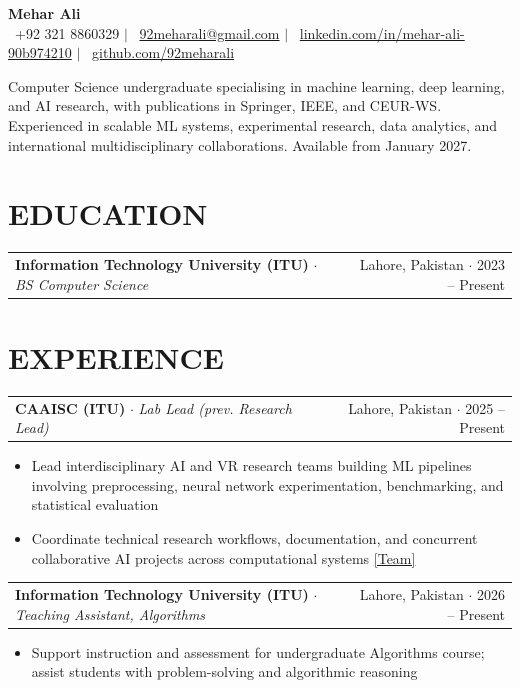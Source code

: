 \documentclass[letterpaper,8.5pt]{article}
\makeatletter
\newcommand{\resumeItem}[1]{
  \item \small{#1}
}
\newcommand{\resumeSubheading}[4]{
  \vspace{1pt}
  \begin{tabular*}{\textwidth}{l@{\extracolsep{\fill}}r}
    \textbf{\small #1} {\color{dark-grey}\small $\cdot$} \textit{\small #3} & {\color{dark-grey}\small #4 $\cdot$ #2} \\
  \end{tabular*}
  \vspace{-5pt}
}
\makeatother
\begin{document}
\begin{center}
    {\LARGE \textbf{Mehar Ali}} \\ \vspace{3pt}
    \small
    \faPhone* \ +92 321 8860329 \hspace{4pt}$|$\hspace{4pt}
    \faEnvelope \ \href{mailto:92meharali@gmail.com}{92meharali@gmail.com} \hspace{4pt}$|$\hspace{4pt}
    \faLinkedin \ \href{https://www.linkedin.com/in/mehar-ali-90b974210}{linkedin.com/in/mehar-ali-90b974210} \hspace{4pt}$|$\hspace{4pt}
    \faGithub \ \href{https://github.com/92meharali}{github.com/92meharali}
\end{center}

\vspace{-8pt}
\small{Computer Science undergraduate specialising in machine learning, deep learning, and AI research, with publications in Springer, IEEE, and CEUR-WS. Experienced in scalable ML systems, experimental research, data analytics, and international multidisciplinary collaborations. Available from January 2027.}

\section{EDUCATION}
\resumeSubheading{Information Technology University (ITU)}{2023 -- Present}{BS Computer Science}{Lahore, Pakistan}

\section{EXPERIENCE}

\resumeSubheading{CAAISC (ITU)}{2025 -- Present}{Lab Lead (prev. Research Lead)}{Lahore, Pakistan}
\begin{itemize}
\resumeItem{Lead interdisciplinary AI and VR research teams building ML pipelines involving preprocessing, neural network experimentation, benchmarking, and statistical evaluation}
\resumeItem{Coordinate technical research workflows, documentation, and concurrent collaborative AI projects across computational systems \href{https://caaisc.itu.edu.pk/team}{[Team]}}
\end{itemize}

\resumeSubheading{Information Technology University (ITU)}{2026 -- Present}{Teaching Assistant, Algorithms}{Lahore, Pakistan}
\begin{itemize}
\resumeItem{Support instruction and assessment for undergraduate Algorithms course; assist students with problem-solving and algorithmic reasoning}
\end{itemize}
\end{document}
